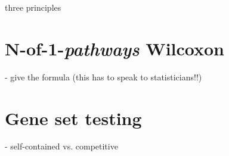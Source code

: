 \indent\indent three principles

\section{N-of-1-\emph{pathways} Wilcoxon}\label{sec:wilcoxon}

- give the formula (this has to speak to statisticians!!)

\section{Gene set testing}\label{sec:genesets}

- self-contained vs. competitive

%
